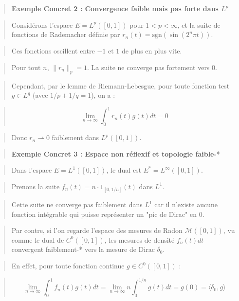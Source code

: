 \documentclass[11pt,a4paper]{article}
\begin{document}
\begin{quote}\textbf{Exemple Concret 2 : Convergence faible mais pas forte dans $L^p$}\end{quote}
\begin{quote}Considérons l'espace $E = L^p([0, 1])$ pour $1 < p < \infty$, et la suite de fonctions de Rademacher définie par $r_n(t) = \text{sgn}(\sin(2^n \pi t))$.\end{quote}
\begin{quote}Ces fonctions oscillent entre $-1$ et $1$ de plus en plus vite. \end{quote}
\begin{quote}Pour tout $n$, $\|r_n\|_p = 1$. La suite ne converge pas fortement vers $0$.\end{quote}
\begin{quote}Cependant, par le lemme de Riemann-Lebesgue, pour toute fonction test $g \in L^q$ (avec $1/p + 1/q = 1$), on a :\end{quote}
\begin{quote}$$\lim_{n \to \infty} \int_0^1 r_n(t) g(t) dt = 0$$\end{quote}
\begin{quote}Donc $r_n \rightharpoonup 0$ faiblement dans $L^p([0, 1])$.\end{quote}

\begin{quote}\textbf{Exemple Concret 3 : Espace non réflexif et topologie faible-}*\end{quote}
\begin{quote}Dans l'espace $E = L^1([0, 1])$, le dual est $E^* = L^\infty([0, 1])$.\end{quote}
\begin{quote}Prenons la suite $f_n(t) = n \cdot 1_{[0, 1/n]}(t)$ dans $L^1$.\end{quote}
\begin{quote}Cette suite ne converge pas faiblement dans $L^1$ car il n'existe aucune fonction intégrable qui puisse représenter un "pic de Dirac" en $0$.\end{quote}
\begin{quote}Par contre, si l'on regarde l'espace des mesures de Radon $\mathcal{M}([0,1])$, vu comme le dual de $C^0([0,1])$, les mesures de densité $f_n(t)dt$ convergent faiblement-* vers la mesure de Dirac $\delta_0$.\end{quote}
\begin{quote}En effet, pour toute fonction continue $g \in C^0([0, 1])$ :\end{quote}
\begin{quote}$$\lim_{n \to \infty} \int_0^1 f_n(t) g(t) dt = \lim_{n \to \infty} n \int_0^{1/n} g(t) dt = g(0) = \langle \delta_0, g \rangle$$\end{quote}
\end{document}

